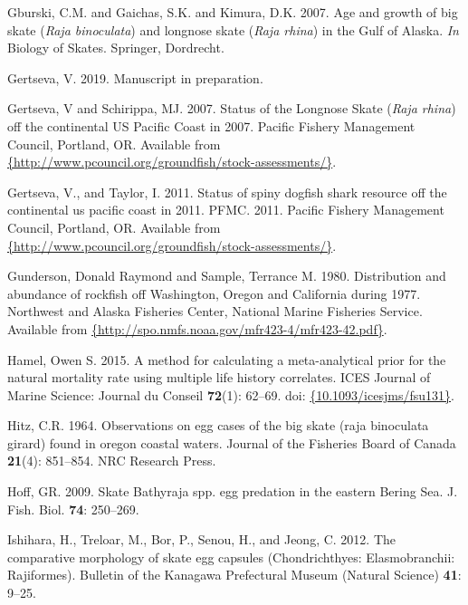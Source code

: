 \documentclass[12pt,]{article}
\begin{document}
\leavevmode\hypertarget{ref-Gburski2007}{}%
Gburski, C.M. and Gaichas, S.K. and Kimura, D.K. 2007. Age and growth of
big skate (\emph{Raja binoculata}) and longnose skate (\emph{Raja
rhina}) in the Gulf of Alaska. \emph{In} Biology of Skates. Springer,
Dordrecht.

\leavevmode\hypertarget{ref-Gertseva2019}{}%
Gertseva, V. 2019. Manuscript in preparation.

\leavevmode\hypertarget{ref-Gertseva2007}{}%
Gertseva, V and Schirippa, MJ. 2007. Status of the Longnose Skate
(\emph{Raja rhina}) off the continental US Pacific Coast in 2007.
Pacific Fishery Management Council, Portland, OR. Available from
\href{\%7Bhttp://www.pcouncil.org/groundfish/stock-assessments/\%7D}{\{http://www.pcouncil.org/groundfish/stock-assessments/\}}.

\leavevmode\hypertarget{ref-Gertseva2011}{}%
Gertseva, V., and Taylor, I. 2011. Status of spiny dogfish shark
resource off the continental us pacific coast in 2011. PFMC. 2011.
Pacific Fishery Management Council, Portland, OR. Available from
\href{\%7Bhttp://www.pcouncil.org/groundfish/stock-assessments/\%7D}{\{http://www.pcouncil.org/groundfish/stock-assessments/\}}.

\leavevmode\hypertarget{ref-Gunderson1980}{}%
Gunderson, Donald Raymond and Sample, Terrance M. 1980. Distribution and
abundance of rockfish off Washington, Oregon and California during 1977.
Northwest and Alaska Fisheries Center, National Marine Fisheries
Service. Available from
\href{\%7Bhttp://spo.nmfs.noaa.gov/mfr423-4/mfr423-42.pdf\%7D}{\{http://spo.nmfs.noaa.gov/mfr423-4/mfr423-42.pdf\}}.

\leavevmode\hypertarget{ref-Hamel2015}{}%
Hamel, Owen S. 2015. A method for calculating a meta-analytical prior
for the natural mortality rate using multiple life history correlates.
ICES Journal of Marine Science: Journal du Conseil \textbf{72}(1):
62--69. doi:
\href{https://doi.org/\%7B10.1093/icesjms/fsu131\%7D}{\{10.1093/icesjms/fsu131\}}.

\leavevmode\hypertarget{ref-Hitz1964}{}%
Hitz, C.R. 1964. Observations on egg cases of the big skate (raja
binoculata girard) found in oregon coastal waters. Journal of the
Fisheries Board of Canada \textbf{21}(4): 851--854. NRC Research Press.

\leavevmode\hypertarget{ref-Hoff2009}{}%
Hoff, GR. 2009. Skate Bathyraja spp. egg predation in the eastern Bering
Sea. J. Fish. Biol. \textbf{74}: 250--269.

\leavevmode\hypertarget{ref-Ishihara2012}{}%
Ishihara, H., Treloar, M., Bor, P., Senou, H., and Jeong, C. 2012. The
comparative morphology of skate egg capsules (Chondrichthyes:
Elasmobranchii: Rajiformes). Bulletin of the Kanagawa Prefectural Museum
(Natural Science) \textbf{41}: 9--25.
\end{document}
